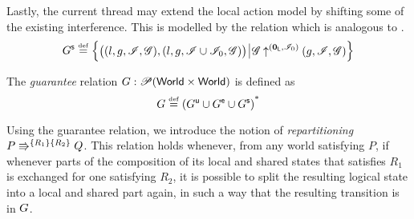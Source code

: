 
Lastly, the current thread may extend the local action model by
shifting some of the existing interference. This is modelled by the
\shiftG relation which is analogous to \shiftR.
\[
\shiftG \eqdef
\left\{
\begin{array}{@{} l @{\hspace*{2pt}} | @{\hspace*{2pt}} r @{}}
  \left(
  \begin{array}{@{} l @{}}
    (l, g, \lmod, \gmod),
    \left( l, g, \lmod \cup \lmod_0, \gmod  \right)
  \end{array}
  \right)
  &
  \expandsAM{\gmod}{\unitL}{\lmod_0}{g}{\lmod}{\gmod}
\end{array}
\right\}
\]

\begin{definition}[Guarantee]
The \emph{guarantee} relation $\guarantee: \powerset (\Worlds \times \Worlds)$ is defined as
\[
\guarantee \eqdef  \left( \updateG \cup \extendG \cup \shiftG \right)^{\text{*}}
\]
\end{definition}

Using the guarantee relation, we introduce the notion of
\emph{repartitioning} $\repartitions{P}{Q}{R_1}{R_2}$. This relation
holds whenever, from any world satisfying $P$, if whenever parts of
the composition of its local and shared states that satisfies $R_1$ is
exchanged for one satisfying $R_2$, it is possible to split the
resulting logical state into a local and shared part again, in such a
way that the resulting transition is in $\guarantee$.

